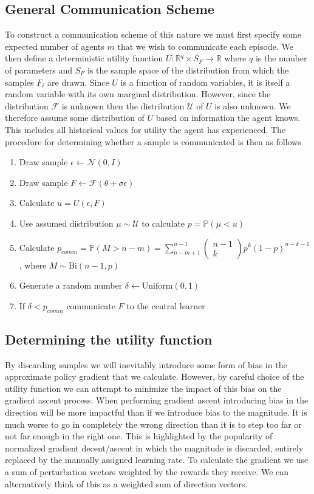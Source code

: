 \subsection{General Communication Scheme}
\label{sec:GeneralScheme}
To construct a communication scheme of this nature we must first specify some expected number of agents $m$ that we wish to communicate each episode.
We then define a deterministic utility function $U: \mathbb{R}^{q} \times S_F \rightarrow \mathbb{R}$ where $q$ is the number of parameters and $S_F$ is the sample space of the distribution from which the samples $F_i$ are drawn.
Since $U$ is a function of random variables, it is itself a random variable with its own marginal distribution. 
However, since the distribution $\mathcal{F}$ is unknown then the distribution $\mathcal{U}$ of $U$ is also unknown. 
We therefore assume some distribution of $U$ based on information the agent knows. 
This includes all historical values for utility the agent has experienced.
The procedure for determining whether a sample is communicated is then as follows
\begin{enumerate}
    \item Draw sample $\epsilon \leftarrow \mathcal{N}(0,I)$
    \item Draw sample $F \leftarrow \mathcal{F}(\theta + \sigma \epsilon)$
    \item Calculate $u = U(\epsilon,F)$
    \item Use assumed distribution $\mu \sim \mathcal{U}$ to calculate $p=\mathbb{P}(\mu < u)$
    \item Calculate $p_{comm}=\mathbb{P}(M>n-m) = \sum_{n-m+1}^{n-1} \begin{pmatrix}n-1 \\ k\end{pmatrix}p^k(1-p)^{n-k-1}$, where $M \sim \text{Bi}(n-1,p)$
    \item Generate a random number $\delta \leftarrow \text{Uniform}(0,1)$
    \item If $\delta<p_{comm}$ communicate $F$ to the central learner
\end{enumerate}

\subsection{Determining the utility function}
By discarding samples we will inevitably introduce some form of bias in the approximate policy gradient that we calculate. 
However, by careful choice of the utility function we can attempt to minimize the impact of this bias on the gradient ascent process.
When performing gradient ascent introducing bias in the direction will be more impactful than if we introduce bias to the magnitude. 
It is much worse to go in completely the wrong direction than it is to step too far or not far enough in the right one. 
This is highlighted by the popularity of normalized gradient decent/ascent \cite{NGD} in which the magnitude is discarded, entirely replaced by the manually assigned learning rate.
To calculate the gradient we use a sum of perturbation vectors weighted by the rewards they receive. We can alternatively think of this as a weighted sum of direction vectors.

